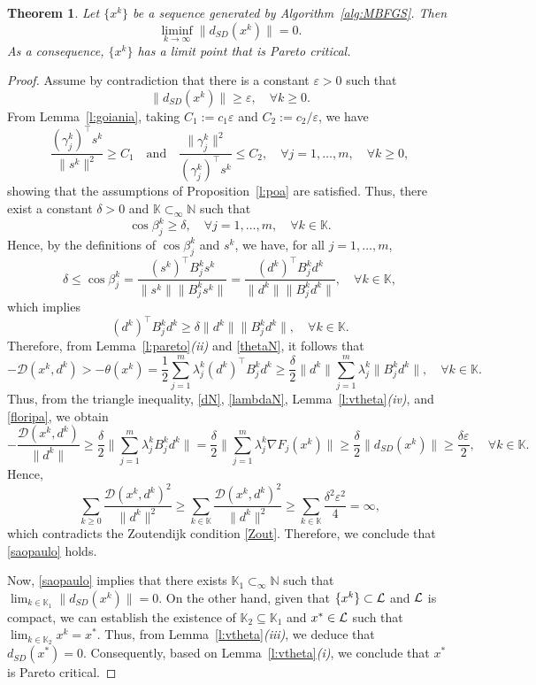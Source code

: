 \documentclass[11pt]{article}
\newtheorem{theorem}{Theorem}[section]
\numberwithin{assumption}{section}
\newcommand{\N}{\mathbb{N}}
\newcommand{\K}{\mathbb{K}}
\newcommand{\Ls}{{\cal{L}}}
\newcommand{\D}{\mathcal{D}}
\newcommand{\dsd}{d_{SD}}
\newcommand{\subsetinf}{\displaystyle\mathop{\subset}_{\infty}}
\begin{document}
\begin{theorem}\label{bh}
Let $\{x^k\}$ be a sequence generated by Algorithm~\ref{alg:MBFGS}. Then
\begin{equation}\label{saopaulo}
\liminf_{k\to\infty}\|\dsd(x^k)\|=0.
\end{equation}
As a consequence, $\{x^k\}$ has a limit point that is Pareto critical.
\end{theorem}
\begin{proof}
Assume by contradiction that there is a constant $\varepsilon>0$ such that
\begin{equation}\label{floripa}
\|\dsd(x^k)\| \geq \varepsilon, \quad \forall k\geq 0.
\end{equation}
From Lemma~\ref{l:goiania}, taking $C_1:=c_1\varepsilon$ and $C_2:=c_2/\varepsilon$, we have
$$\dfrac{(\gamma_j^{k})^\top s^k}{\|s^k\|^2}\geq C_1  \quad \mbox{and} \quad \dfrac{\|\gamma_j^{k}\|^2}{(\gamma_j^{k})^\top s^k}\leq C_2,  \quad \forall j=1,\ldots,m, \quad \forall k\geq 0,$$
showing that the assumptions of Proposition~\ref{l:poa} are satisfied. Thus, there exist a constant $\delta>0$ and $\K\subsetinf\N$ such that 
\[\cos\beta_j^{k} \geq \delta, \quad  \forall j = 1,\ldots,m, \quad \forall k\in \K.\] 
Hence, by the definitions of $\cos\beta_j^k$ and $s^k$, we have, for all $j = 1,\ldots,m$,
\[\delta\leq  \cos\beta_j^k = \frac{(s^k)^\top B_j^ks^k}{\|s^k\|\|B_j^ks^k\|}=\frac{(d^k)^\top B_j^kd^k}{\|d^k\|\|B_j^kd^k\|}, \quad \forall k\in \K,\]
which implies
\[(d^k)^\top B_j^kd^k \geq \delta \|d^k\|\|B_j^kd^k\|, \quad  \forall k\in \K.\]
Therefore, from Lemma~\ref{l:pareto}{\it (ii)} and \eqref{thetaN}, it follows that
\[-\D(x^k,d^k)>-\theta(x^k) =  \frac{1}{2} \sum_{j=1}^{m} \lambda_j^k (d^k)^\top B_j^k d^k \geq \frac{\delta}{2}  \|d^k\| \sum_{j=1}^{m} \lambda_j^k \|B_j^kd^k\|, \quad \forall k\in \K.\]
Thus, from the triangle inequality, \eqref{dN}, \eqref{lambdaN}, Lemma~\ref{l:vtheta}{\it (iv)}, and \eqref{floripa}, we obtain
\[-\dfrac{\D(x^k,d^k)}{\|d^k\|} \geq \frac{ \delta}{2}  \|\sum_{j=1}^{m} \lambda_j^k B_j^kd^k\| =  \frac{\delta}{2}  \|\sum_{j=1}^{m} \lambda_j^k \nabla F_j(x^k)\|\geq  \frac{ \delta}{2}  \|\dsd(x^k)\| \geq \frac{ \delta \varepsilon}{2}, \quad \forall k\in \K.\]
Hence, 
\[\sum_{k\geq 0}  \dfrac{\D(x^k,d^k)^2}{\|d^k\|^2}\geq  \sum_{k\in \K} \dfrac{\D(x^k,d^k)^2}{\|d^k\|^2}\geq \sum_{k\in \K} \dfrac{\delta^2\varepsilon^2}{4}=\infty,\]
which contradicts the Zoutendijk condition \eqref{Zout}. Therefore, we conclude that \eqref{saopaulo} holds.

Now, \eqref{saopaulo} implies that there exists $\K_1\subsetinf\N$ such that $\lim_{k\in\K_1}\|\dsd(x^k)\|=0$. On the other hand, given that $\{x^k\}\subset \Ls$ and $\Ls$ is compact, we can establish the existence of $\K_2\subseteq \K_1$ and  $x^{\ast}\in \Ls$ such that $\lim_{k\in \K_2}x^k= x^{\ast}$. Thus, from Lemma~\ref{l:vtheta}{\it (iii)}, we deduce that $\dsd(x^{\ast})=0$. Consequently, based on Lemma~\ref{l:vtheta}{\it (i)}, we conclude that $x^{\ast}$ is Pareto critical.
\end{proof}
\end{document}
